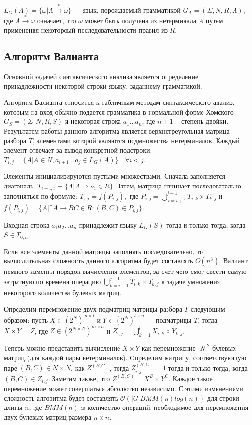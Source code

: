 \documentclass[14pt]{matmex-diploma-custom}
\begin{document}
$L_{G}(A) = \{ \omega | A\xrightarrow{*} \omega\}$ --- язык, порождаемый грамматикой $G_{A} = (\Sigma, N, R, A)$, где $A \xrightarrow{*} \omega$ означает, что $\omega$ может быть получена из нетерминала $A$ путем применения некотороый последовательности правил из $R$.

\subsection{Алгоритм Валианта}

Основной задачей синтаксического анализа является определение принадлежности некоторой строки языку, заданному грамматикой.

Алгоритм Валианта относится к табличным методам синтаксического анализ, которым на вход обычно подается грамматика в нормальной форме Хомского $G_S = (\Sigma, N, R, S)$ и некоторая строка $a_{1} \dots a_{n}$, где $n + 1$ -- степень двойки. Результатом работы данного алгоритма является верхнетреугольная матрица разбора $T$, элементами которой являются подмножества нетерминалов. Каждый элемент отвечает за вывод конкретной подстроки: $T_{i, j} =  \{ A | A \in N, a_{i + 1} \dots a_{j} \in L_{G}(A)\} \quad \forall i < j$.

Элементы инициализируются пустыми множествами.
Сначала заполняется диагональ: $T_{i - 1, i} = \{ A | A \rightarrow a_{i} \in R\}.$ 
Затем, матрица начинает последовательно заполняться по формуле:
$T_{i, j} = f(P_{i, j}),$ 
где $P_{i, j} = \bigcup\limits_{k = i + 1}^{j - 1} T_{i,k} \times T_{k, j}$ и
$f(P_{i, j}) = \{A | \exists A \rightarrow BC \in R : (B, C) \in P_{i, j}\}.$

Входная строка $a_{1}a_{2} \dots a_{n}$ принадлежит языку $L_{G}(S)$ тогда и только тогда, когда $S \in T_{0, n}$.

Если все элементы данной матрицы заполнять последовательно, то вычислительная сложность данного алгоритма будет составлять $O(n^3)$. Валиант немного изменил порядок вычисления элементов, за счет чего смог свести самую затратную по времени операцию $\bigcup\limits_{k = i + 1}^{j - 1} T_{i, k} \times T_{k, j}$ к задаче умножения некоторого количества булевых матриц.

Определим перемножение двух подматриц матрицы разбора $T$ следующим образом: пусть $X \in (2^N)^{m \times l}$ и $Y \in (2^N)^{l \times n}$ --- подматрицы $T$, тогда $X \times Y = Z$, где $Z \in (2^{N \times N})^{m \times n}$ и $Z_{i, j} = \bigcup\limits_{k = 1}^{l} X_{i, k} \times Y_{k, j}$.

Теперь можно представить вычисление $X \times Y$ как перемножение $|N|^2$ булевых матриц (для каждой пары нетерминалов).
Определим матрицу, соответствующую паре $(B, C) \in N \times N$, как $Z^{(B, C)}$, тогда $Z_{i, j}^{(B, C)} = 1$ тогда и только тогда, когда $(B, C) \in Z_{i, j}$.
Заметим также, что $Z^{(B, C)} = X^{B} \times Y^{C}$.
Каждое такое перемножение может совершаться абсолютно независимо.
С этими изменениями сложность алгоритма будет составлять $\mathcal{O}(|G|BMM(n)log(n))$ для строки длины $n$, где $BMM(n)$ is количество операций, необходимое для перемножения двух булевых матриц размера $n \times n$.
\end{document}
